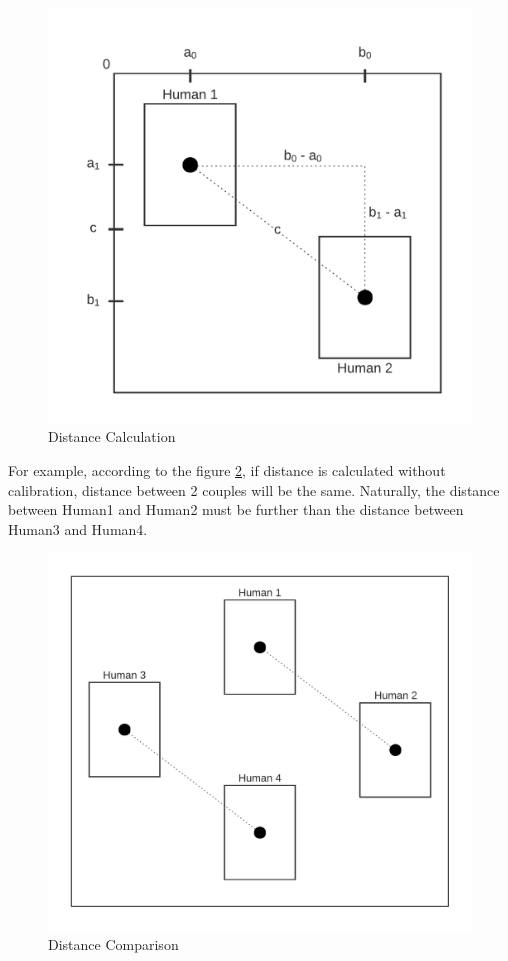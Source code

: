         \begin{figure}[!ht]
            \includegraphics[width=6in]{images/chapter2/distance.png}
            \caption{Distance Calculation}
            \label{distanceCalculation}
        \end{figure}

        For example, according to the figure \ref{twoDistances},
        if distance is calculated without calibration, distance between 2 couples will be the same.
        Naturally, the distance between Human1 and Human2 must be further than the distance between Human3 and Human4.

        \begin{figure}[!ht]
            \includegraphics[width=6in]{images/chapter2/two-distances.png}
            \caption{Distance Comparison}
            \label{twoDistances}
        \end{figure}

